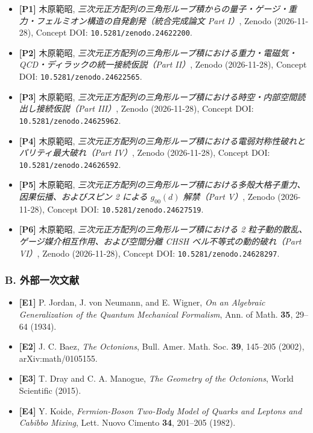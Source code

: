 \documentclass[
  a4paper,
]{ltjsarticle}
\providecommand{\tightlist}{%
  \setlength{\itemsep}{0pt}\setlength{\parskip}{0pt}}
\begin{document}
\begin{itemize}
\tightlist
\item
  \textbf{{[}P1{]}} 木原範昭,
  \emph{三次元正方配列の三角形ループ積からの量子・ゲージ・重力・フェルミオン構造の自発創発（統合完成論文
  Part I）}, Zenodo (2026-11-28), Concept DOI:
  \texttt{10.5281/zenodo.24622200}.
\item
  \textbf{{[}P2{]}} 木原範昭,
  \emph{三次元正方配列の三角形ループ積における重力・電磁気・QCD・ディラックの統一接続仮説（Part
  II）}, Zenodo (2026-11-28), Concept DOI:
  \texttt{10.5281/zenodo.24622565}.
\item
  \textbf{{[}P3{]}} 木原範昭,
  \emph{三次元正方配列の三角形ループ積における時空・内部空間読出し接続仮説（Part
  III）}, Zenodo (2026-11-28), Concept DOI:
  \texttt{10.5281/zenodo.24625962}.
\item
  \textbf{{[}P4{]}} 木原範昭,
  \emph{三次元正方配列の三角形ループ積における電弱対称性破れとパリティ最大破れ（Part
  IV）}, Zenodo (2026-11-28), Concept DOI:
  \texttt{10.5281/zenodo.24626592}.
\item
  \textbf{{[}P5{]}} 木原範昭,
  \emph{三次元正方配列の三角形ループ積における多殻大格子重力、因果伝播、およびスピン
  2 による \(g_{00}(d)\) 解禁（Part V）}, Zenodo (2026-11-28), Concept
  DOI: \texttt{10.5281/zenodo.24627519}.
\item
  \textbf{{[}P6{]}} 木原範昭,
  \emph{三次元正方配列の三角形ループ積における 2
  粒子動的散乱、ゲージ媒介相互作用、および空間分離 CHSH
  ベル不等式の動的破れ（Part VI）}, Zenodo (2026-11-28), Concept DOI:
  \texttt{10.5281/zenodo.24628297}.
\end{itemize}

\subsubsection{B.
外部一次文献}\label{b.-ux5916ux90e8ux4e00ux6b21ux6587ux732e}

\begin{itemize}
\tightlist
\item
  \textbf{{[}E1{]}} P. Jordan, J. von Neumann, and E. Wigner, \emph{On
  an Algebraic Generalization of the Quantum Mechanical Formalism}, Ann.
  of Math. \textbf{35}, 29--64 (1934).
\item
  \textbf{{[}E2{]}} J. C. Baez, \emph{The Octonions}, Bull. Amer. Math.
  Soc. \textbf{39}, 145--205 (2002), arXiv:math/0105155.
\item
  \textbf{{[}E3{]}} T. Dray and C. A. Manogue, \emph{The Geometry of the
  Octonions}, World Scientific (2015).
\item
  \textbf{{[}E4{]}} Y. Koide, \emph{Fermion-Boson Two-Body Model of
  Quarks and Leptons and Cabibbo Mixing}, Lett. Nuovo Cimento
  \textbf{34}, 201--205 (1982).
\end{itemize}
\end{document}
